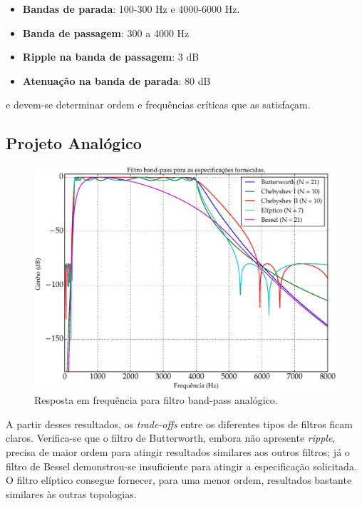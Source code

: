 \begin{itemize}
\item \textbf{Bandas de parada}: 100-300 Hz e 4000-6000 Hz.
\item \textbf{Banda de passagem}: 300 a 4000 Hz
\item \textbf{Ripple na banda de passagem}: 3 dB
\item \textbf{Atenuação na banda de parada}: 80 dB
\end{itemize}

e devem-se determinar ordem e frequências críticas que as satisfaçam.

\subsection{Projeto Analógico}

\begin{figure}[H]
  \centering
  \includegraphics[scale=0.55]{images/plots/bandpass_analog}
  \caption{Resposta em frequência para filtro band-pass analógico.}
  \label{fig:bandpass_analog}
\end{figure}

A partir desses resultados, os \textit{trade-offs} entre os diferentes tipos de filtros ficam claros. Verifica-se que o filtro de Butterworth, embora não apresente \textit{ripple}, precisa de maior ordem para atingir resultados similares aos outros filtros; já o filtro de Bessel demonstrou-se insuficiente para atingir a especificação solicitada. O filtro elíptico consegue fornecer, para uma menor ordem, resultados bastante similares às outras topologias.

